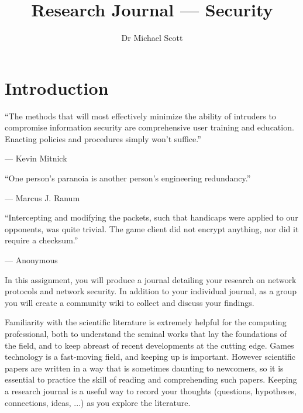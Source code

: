 \documentclass{../../fal_assignment}
\title{Research Journal --- Security}
\author{Dr Michael Scott}
\begin{document}
\maketitle

\section*{Introduction}

\begin{marginquote}
  ``The methods that will most effectively minimize the ability of intruders to compromise information security are comprehensive user training and education. Enacting policies and procedures simply won't suffice.''
    
    --- Kevin Mitnick
    
    \marginquoterule
    
    ``One person's paranoia is another person's engineering redundancy.''
    
    --- Marcus J. Ranum
    
    \marginquoterule

        ``Intercepting and modifying the packets, such that handicaps were applied to our opponents, was quite trivial. The game client did not encrypt anything, nor did it require a checksum.''
    
    --- Anonymous
            
\end{marginquote}

In this assignment, you will produce a journal detailing your research on network protocols and network security. In addition to your individual journal, as a group you will create a community wiki to collect and discuss your findings.

Familiarity with the scientific literature is extremely helpful for the computing professional,
both to understand the seminal works that lay the foundations of the field,
and to keep abreast of recent developments at the cutting edge.
Games technology is a fast-moving field, and keeping up is important.
However scientific papers are written in a way that is sometimes daunting to newcomers,
so it is essential to practice the skill of reading and comprehending such papers.
Keeping a research journal is a useful way to record your thoughts
(questions, hypotheses, connections, ideas, ...) as you explore the literature.
\end{document}
